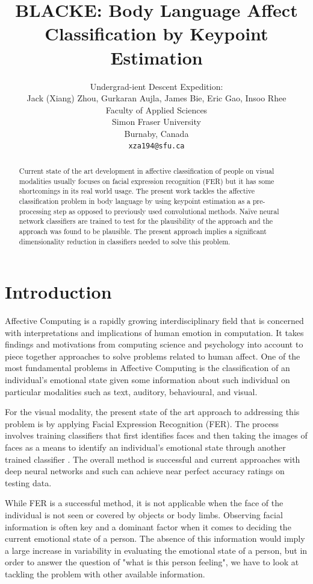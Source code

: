 \documentclass{article}
\title{BLACKE: Body Language Affect Classification by Keypoint Estimation}
\author{
  Undergrad-ient Descent Expedition: \\
  Jack (Xiang) Zhou, Gurkaran Aujla, James Bie, Eric Gao, Insoo Rhee\\
  Faculty of Applied Sciences\\
  Simon Fraser University\\
  Burnaby, Canada\\
  \texttt{xza194@sfu.ca} \\
}
\begin{document}
\maketitle

\begin{abstract}
Current state of the art development in affective classification of people on visual modalities usually focuses on facial expression recognition (FER) but it has some shortcomings in its real world usage. The present work tackles the affective classification problem in body language by using keypoint estimation as a pre-processing step as opposed to previously used convolutional methods. Na\"ive neural network classifiers are trained to test for the plausibility of the approach and the approach was found to be plausible. The present approach implies a significant dimensionality reduction in classifiers needed to solve this problem.
\end{abstract}

\section{Introduction}

Affective Computing is a rapidly growing interdisciplinary field that is concerned with interpretations and implications of human emotion in computation. It takes findings and motivations from computing science and psychology into account to piece together approaches to solve problems related to human affect. One of the most fundamental problems in Affective Computing is the classification of an individual's emotional state given some information about such individual on particular modalities such as text, auditory, behavioural, and visual.

For the visual modality, the present state of the art approach to addressing this problem is by applying Facial Expression Recognition (FER). The process involves training classifiers that first identifies faces and then taking the images of faces as a means to identify an individual's emotional state through another trained classifier \citep{li2018deep}. The overall method is successful and current approaches with deep neural networks and such can achieve near perfect accuracy ratings on testing data. 

While FER is a successful method, it is not applicable when the face of the individual is not seen or covered by objects or body limbs. Observing facial information is often key and a dominant factor when it comes to deciding the current emotional state of a person. The absence of this information would imply a large increase in variability in evaluating the emotional state of a person, but in order to answer the question of "what is this person feeling", we have to look at tackling the problem with other available information.
\end{document}
